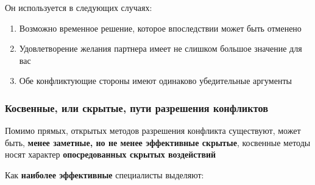 \documentclass{article}
\begin{document}
\begin{enumerate}
    Он используется в следующих случаях:
    \begin{enumerate}
        \item Возможно временное решение, которое впоследствии может быть отменено
        \item Удовлетворение желания партнера имеет не слишком большое значение для вас
        \item Обе конфликтующие стороны имеют одинаково убедительные аргументы
    \end{enumerate}
\end{enumerate}

\subsubsection{Косвенные, или скрытые, пути разрешения конфликтов}

Помимо прямых, открытых методов разрешения конфликта существуют, может быть, \textbf{менее заметные, но не менее эффективные скрытые}, косвенные методы носят характер \textbf{опосредованных скрытых воздействий}

Как \textbf{наиболее эффективные} специалисты выделяют:
\end{document}
